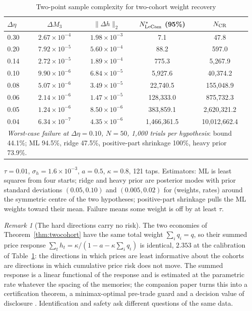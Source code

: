 \documentclass[12pt]{article}
\theoremstyle{definition}
\theoremstyle{remark}
\newtheorem{remark}[theorem]{Remark}
\begin{document}
\begin{table}[t]\centering\small
\begin{threeparttable}
\caption{Two-point sample complexity for two-cohort weight recovery}\label{tab:lecam}
\begin{tabular}{lcccc}
\toprule
$\Delta\eta$ & $\Delta M_3$ & $\|\Delta h\|_2$ & $N^*_{\rm LeCam}$ (95\%) & $N_{\rm CR}$\\
\midrule
0.30 & $2.67\times10^{-4}$ & $1.98\times10^{-3}$ & 7.1 & 47.8\\
0.20 & $7.92\times10^{-5}$ & $5.60\times10^{-4}$ & 88.2 & 597.0\\
0.14 & $2.72\times10^{-5}$ & $1.89\times10^{-4}$ & 775.3 & 5{,}267.9\\
0.10 & $9.90\times10^{-6}$ & $6.84\times10^{-5}$ & 5{,}927.6 & 40{,}374.2\\
0.08 & $5.07\times10^{-6}$ & $3.49\times10^{-5}$ & 22{,}740.5 & 155{,}048.9\\
0.06 & $2.14\times10^{-6}$ & $1.47\times10^{-5}$ & 128{,}333.0 & 875{,}732.3\\
0.05 & $1.24\times10^{-6}$ & $8.50\times10^{-6}$ & 383{,}859.1 & 2{,}620{,}321.2\\
0.04 & $6.34\times10^{-7}$ & $4.35\times10^{-6}$ & 1{,}466{,}361.5 & 10{,}012{,}662.4\\
\midrule
\multicolumn{5}{p{0.85\textwidth}}{\emph{Worst-case failure at $\Delta\eta=0.10$, $N=50$, 1,000 trials per hypothesis}: bound 44.1\%; ML 94.5\%, ridge 47.5\%, positive-part shrinkage 100\%, heavy prior 73.9\%.}\\
\bottomrule
\end{tabular}
\begin{tablenotes}\footnotesize\item $\tau=0.01$, $\sigma_h=1.6\times10^{-3}$, $a=0.5$, $\kappa=0.8$, 121 taps. Estimators: ML is least squares from four starts; ridge and heavy prior are posterior modes with prior standard deviations $(0.05,0.10)$ and $(0.005,0.02)$ for (weights, rates) around the symmetric centre of the two hypotheses; positive-part shrinkage pulls the ML weights toward their mean. Failure means some weight is off by at least $\tau$.\end{tablenotes}
\end{threeparttable}
\end{table}

\begin{remark}[The hard directions carry no risk]\label{rem:riskneutral}
The two economies of Theorem~\ref{thm:twocohort} have the same total weight $\sum_iq_i=q$, so their summed price response $\sum_th_t=\kappa/(1-a-\kappa\sum_iq_i)$ is identical, $2.353$ at the calibration of Table~\ref{tab:lecam}: the directions in which prices are least informative about the cohorts are directions in which cumulative price risk does not move. The summed response is a linear functional of the response and is estimated at the parametric rate whatever the spacing of the memories; the companion paper turns this into a certification theorem, a minimax-optimal pre-trade guard and a decision value of disclosure \citep{niroula2026b}. Identification and safety ask different questions of the same data.
\end{remark}
\end{document}
